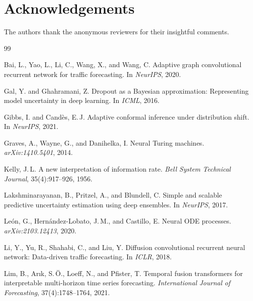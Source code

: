 \documentclass[11pt,a4paper]{article}
\begin{document}
\section*{Acknowledgements}
The authors thank the anonymous reviewers for their insightful comments.


\begin{thebibliography}{99}

  Bai, L., Yao, L., Li, C., Wang, X., and Wang, C.
  \newblock Adaptive graph convolutional recurrent network for traffic forecasting.
  \newblock In \emph{NeurIPS}, 2020.

  Gal, Y. and Ghahramani, Z.
  \newblock Dropout as a {Bayesian} approximation: Representing model uncertainty in deep learning.
  \newblock In \emph{ICML}, 2016.

  Gibbs, I. and Cand\`{e}s, E.\,J.
  \newblock Adaptive conformal inference under distribution shift.
  \newblock In \emph{NeurIPS}, 2021.

  Graves, A., Wayne, G., and Danihelka, I.
  \newblock Neural {Turing} machines.
  \newblock \emph{arXiv:1410.5401}, 2014.

  Kelly, J.\,L.
  \newblock A new interpretation of information rate.
  \newblock \emph{Bell System Technical Journal}, 35(4):917--926, 1956.

  Lakshminarayanan, B., Pritzel, A., and Blundell, C.
  \newblock Simple and scalable predictive uncertainty estimation using deep ensembles.
  \newblock In \emph{NeurIPS}, 2017.

  Le\'{o}n, G., Hern\'{a}ndez-Lobato, J.\,M., and Castillo, E.
  \newblock Neural {ODE} processes.
  \newblock \emph{arXiv:2103.12413}, 2020.

  Li, Y., Yu, R., Shahabi, C., and Liu, Y.
  \newblock Diffusion convolutional recurrent neural network: Data-driven traffic forecasting.
  \newblock In \emph{ICLR}, 2018.

  Lim, B., Ar\i k, S.\,\"{O}., Loeff, N., and Pfister, T.
  \newblock Temporal fusion transformers for interpretable multi-horizon time series forecasting.
  \newblock \emph{International Journal of Forecasting}, 37(4):1748--1764, 2021.


\end{thebibliography}
\end{document}
